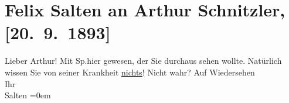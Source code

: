 

         
         \renewcommand{\erwaehntePersonen}{Personen: Felix Salten, Richard Specht}
         \renewcommand{\erwaehnteOrte}{Orte: Wien}
         \renewcommand{\erwaehnteWerke}{}
               \section[Felix Salten an Arthur Schnitzler, {[}20. 9. 1893{]}]{ Felix Salten an Arthur Schnitzler, {[}20. 9. 1893{]}}\nopagebreak{}\rehead{ }\begin{ledgroupsized}[t]{13cm}\normalsize\beginnumbering{} \toendnotes[C]{\smallbreak\pagebreak[2]} 
\pstart
           \noindent{}{\pb}Lieber Arthur! Mit Sp.hier gewesen, der Sie durchaus sehen wollte.
               Natürlich wissen Sie von seiner Krankheit
               { }\uline{nichts}! Nicht wahr?\pend
           \pstart
           Auf Wiedersehen {\\[\baselineskip]}Ihr {\\[\baselineskip]}\spacefill\mbox{Salten}\pend
           \leftskip=0em{}
         
         \endnumbering{}\end{ledgroupsized}  \newcommand{\dateiname}{L03129}\newcommand{\titel}{Felix Salten an Arthur Schnitzler, [20. 9. 1893]}\newcommand{\editorInnen}{Martin Anton Müller und Laura Untner}
      